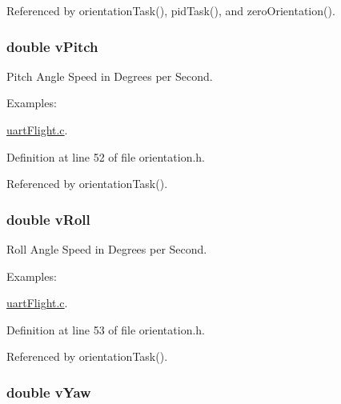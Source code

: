 Referenced by orientation\-Task(), pid\-Task(), and zero\-Orientation().

\hypertarget{struct_angles_acd2ab495f15d37525f00fa358444a7e8}{
\subsubsection[{v\-Pitch}]{\setlength{\rightskip}{0pt plus 5cm}double v\-Pitch}}\label{struct_angles_acd2ab495f15d37525f00fa358444a7e8}


Pitch Angle Speed in Degrees per Second. 

\begin{Desc}
\item[Examples\-: ]\par
\hyperlink{uart_flight_8c-example}{uart\-Flight.\-c}.\end{Desc}


Definition at line 52 of file orientation.\-h.



Referenced by orientation\-Task().

\hypertarget{struct_angles_ae5dfe118046f69d156389c62c33de4fc}{
\subsubsection[{v\-Roll}]{\setlength{\rightskip}{0pt plus 5cm}double v\-Roll}}\label{struct_angles_ae5dfe118046f69d156389c62c33de4fc}


Roll Angle Speed in Degrees per Second. 

\begin{Desc}
\item[Examples\-: ]\par
\hyperlink{uart_flight_8c-example}{uart\-Flight.\-c}.\end{Desc}


Definition at line 53 of file orientation.\-h.



Referenced by orientation\-Task().

\hypertarget{struct_angles_a87a17eab9b8d06fdb255aae737aedcbf}{
\subsubsection[{v\-Yaw}]{\setlength{\rightskip}{0pt plus 5cm}double v\-Yaw}}\label{struct_angles_a87a17eab9b8d06fdb255aae737aedcbf}


